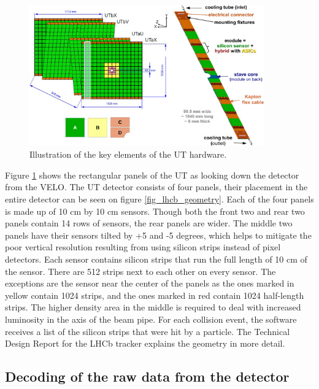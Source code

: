 \documentclass[12pt]{article}
\begin{document}
\begin{figure}[H]
	\begin{center}
		\includegraphics[width=0.9\textwidth]{detector_ut_geometry}
	\end{center}
	\caption[UT detector hardware blueprint]{Illustration of the key elements of the UT hardware. \cite{tracker_tdr}}
	\label{fig_ut_geometry}
\end{figure}

Figure \ref{fig_ut_geometry} shows the rectangular panels of the UT as looking down the detector from the VELO. The UT detector consists of four panels, their placement in the entire detector can be seen on figure \ref{fig_lhcb_geometry}. Each of the four panels is made up of 10 cm by 10 cm sensors. Though both the front two and rear two panels contain 14 rows of sensors, the rear panels are wider. The middle two panels have their sensors tilted by +5 and -5 degrees, which helps to mitigate the poor vertical resolution resulting from using silicon strips instead of pixel detectors. Each sensor contains silicon strips that run the full length of 10 cm of the sensor. There are 512 strips next to each other on every sensor. The exceptions are the sensor near the center of the panels as the ones marked in yellow contain 1024 strips, and the ones marked in red contain 1024 half-length strips. The higher density area in the middle is required to deal with increased luminosity in the axis of the beam pipe. For each collision event, the software receives a list of the silicon strips that were hit by a particle. The Technical Design Report for the LHCb tracker\cite{tracker_tdr} explains the geometry in more detail.


\subsection{Decoding of the raw data from the detector}
\end{document}
